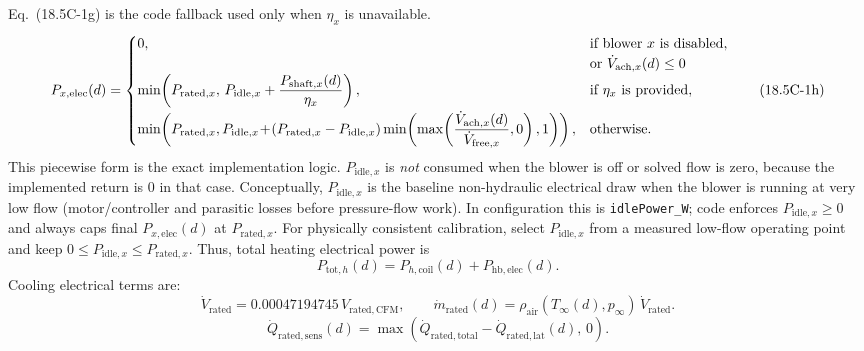 \documentclass[11pt]{article}
\begin{document}
\noindent Eq.~(18.5C-1g) is the code fallback used only when \(\eta_x\) is unavailable.
\begin{equation}
P_{x,\mathrm{elec}}(d)=
\begin{cases}
0, & \begin{array}[t]{@{}l@{}}\text{if blower \(x\) is disabled}\\\text{or }\dot V_{\mathrm{ach},x}(d)\le 0\end{array},\\[4pt]
\min\!\left(P_{\mathrm{rated},x},\,P_{\mathrm{idle},x}+\dfrac{P_{\mathrm{shaft},x}(d)}{\eta_x}\right), &
\text{if }\eta_x\text{ is provided},\\[8pt]
\min\!\left(
P_{\mathrm{rated},x},
P_{\mathrm{idle},x}
\!+\!
\left(P_{\mathrm{rated},x}-P_{\mathrm{idle},x}\right)
\min\!\left(\max\!\left(\dfrac{\dot V_{\mathrm{ach},x}(d)}{\dot V_{\mathrm{free},x}},0\right),1\right)
\right), &
\text{otherwise}.
\end{cases}
\tag{18.5C-1h}
\end{equation}
This piecewise form is the exact implementation logic. \(P_{\mathrm{idle},x}\) is \emph{not} consumed when the blower is off or solved flow is zero, because the implemented return is \(0\) in that case.
Conceptually, \(P_{\mathrm{idle},x}\) is the baseline non-hydraulic electrical draw when the blower is running at very low flow (motor/controller and parasitic losses before pressure-flow work). In configuration this is \texttt{idlePower\_W}; code enforces \(P_{\mathrm{idle},x}\ge 0\) and always caps final \(P_{x,\mathrm{elec}}(d)\) at \(P_{\mathrm{rated},x}\).
For physically consistent calibration, select \(P_{\mathrm{idle},x}\) from a measured low-flow operating point and keep \(0\le P_{\mathrm{idle},x}\le P_{\mathrm{rated},x}\).
Thus, total heating electrical power is
\begin{equation}
P_{\mathrm{tot},h}(d)=P_{h,\mathrm{coil}}(d)+P_{\mathrm{hb},\mathrm{elec}}(d).
\tag{18.5C-2}
\end{equation}
\noindent Cooling electrical terms are:
\begin{equation}
\dot V_{\mathrm{rated}}=0.00047194745\,V_{\mathrm{rated,CFM}},\qquad
\dot m_{\mathrm{rated}}(d)=\rho_{\mathrm{air}}(T_\infty(d),p_\infty)\,\dot V_{\mathrm{rated}}.
\tag{18.5C-3a0}
\end{equation}
\begin{equation}
\dot Q_{\mathrm{rated,sens}}(d)=\max\!\left(\dot Q_{\mathrm{rated,total}}-\dot Q_{\mathrm{rated,lat}}(d),\,0\right).
\tag{18.5C-3a0a}
\end{equation}
\end{document}
